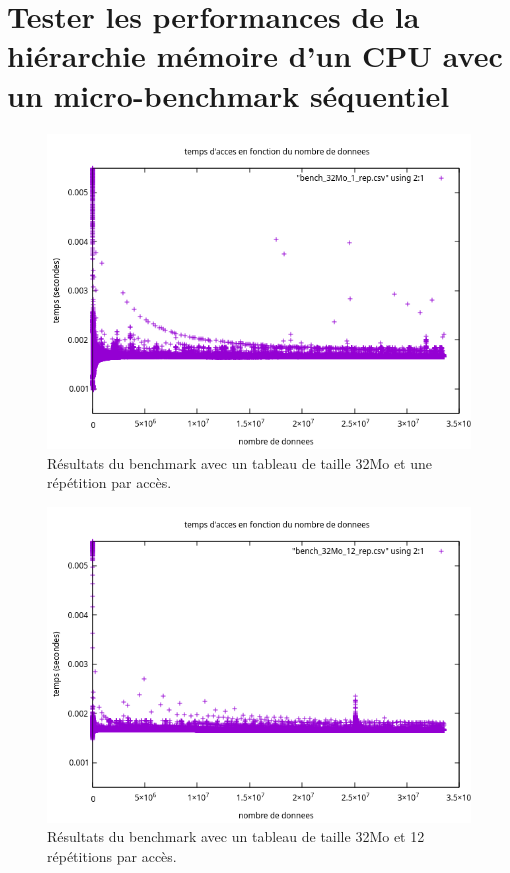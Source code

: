 \documentclass{rapport}
\begin{document}
    \section{Tester les performances de la hiérarchie mémoire d’un CPU avec un micro-benchmark séquentiel}
    \begin{figure}[H]
    \centering
    \includegraphics[width=1\textwidth]{../exercice_1/resultats/resultats.benchmark-1rep-32Mo.png}
    \caption{Résultats du benchmark avec un tableau de taille 32Mo et une répétition par accès.}
    \label{fig:image1}
    \end{figure}
    \begin{figure}[H]
    \centering
    \includegraphics[width=1\textwidth]{../exercice_1/resultats/resultats.benchmark-12rep-32Mo.png}
    \caption{Résultats du benchmark avec un tableau de taille 32Mo et 12 répétitions par accès.}
    \label{fig:image2}
    \end{figure}
\end{document}
